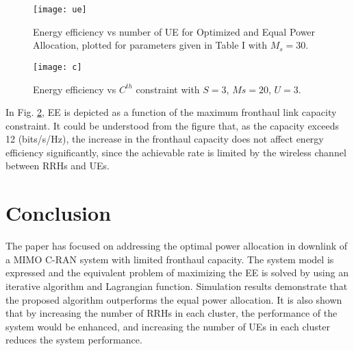 \documentclass[conference,10pt,twocolumn,letter]{IEEEtran}
\begin{document}
  \begin{figure}
  \centering
    \texttt{[image: ue]}
  \caption{Energy efficiency vs number of UE for Optimized and Equal Power Allocation, plotted for parameters given in Table I with $M_s=30$.}
  \label{fig:nem2}
\end{figure}
%
%
\begin{figure}
  \centering
    \texttt{[image: c]}
  \caption{Energy efficiency vs ${C}^{th} $ constraint with $S =3$, $Ms= 20$, $U =3$. }
  \label{fig:nem3}
\end{figure}


In Fig. \ref{fig:nem3}, EE is depicted as a function of the maximum fronthaul link capacity constraint. It could be understood from the figure that, as the capacity exceeds 12 (bits/s/Hz), the increase in the fronthaul capacity does not affect energy efficiency significantly, since the achievable rate is limited by the wireless channel between RRHs and UEs.
\section{Conclusion}
The paper has focused on addressing the optimal power allocation in downlink of a MIMO C-RAN system with limited fronthaul capacity.
The system model is expressed and the equivalent problem of maximizing the EE is solved by using an iterative algorithm and Lagrangian function.
Simulation results demonstrate that the proposed algorithm outperforms the equal power allocation. It is also shown that by increasing the number of RRHs in each cluster, the performance of the system would be enhanced, and increasing the number of UEs in each cluster reduces the system performance.




\
\end{document}
